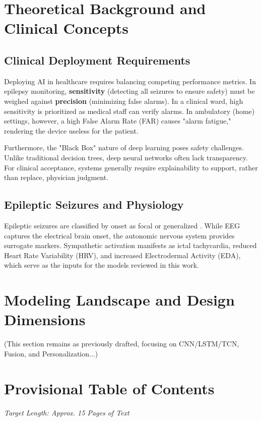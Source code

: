\section{Theoretical Background and Clinical Concepts}

\subsection{Clinical Deployment Requirements}
Deploying AI in healthcare requires balancing competing performance
metrics. In epilepsy monitoring, \textbf{sensitivity} (detecting all
seizures to ensure safety) must be weighed against \textbf{precision}
(minimizing false alarms). In a clinical ward, high sensitivity is
prioritized as medical staff can verify alarms. In ambulatory (home)
settings, however, a high False Alarm Rate (FAR) causes "alarm
fatigue," rendering the device useless for the patient.

Furthermore, the "Black Box" nature of deep learning poses safety
challenges. Unlike traditional decision trees, deep neural networks
often lack transparency. For clinical acceptance, systems generally
require explainability to support, rather than replace, physician
judgment.

\subsection{Epileptic Seizures and Physiology}
Epileptic seizures are classified by onset as focal or generalized
\parencite{fisherInstructionManualILAE2017}. While EEG captures the
electrical brain onset, the autonomic nervous system provides surrogate
markers. Sympathetic activation manifests as ictal tachycardia,
reduced Heart Rate Variability (HRV), and increased Electrodermal
Activity (EDA), which serve as the inputs for the models reviewed in
this work.

\section{Modeling Landscape and Design Dimensions}
(This section remains as previously drafted, focusing on CNN/LSTM/TCN,
Fusion, and Personalization...)

\newpage
\section*{Provisional Table of Contents}
\textit{Target Length: Approx. 15 Pages of Text}


